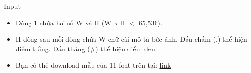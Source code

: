 Input
\begin{itemize}
	\item 

     Dòng  1 chứa hai số W và H (W x H $<$ 65,536).    
	\item 

     H dòng sau mỗi dòng chứa W chữ cái mô tả bức ảnh. Dấu  chấm (.) thể hiện điểm trắng. Dấu thăng (\#) thể hiện điểm đen.    
	\item 

     Bạn có thể download mẫu của 11 font trên tại:     \href{../../../content/voj:VMVSOS.zip}{      link     }
\end{itemize}